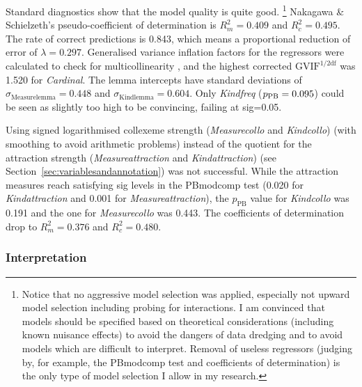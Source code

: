 Standard diagnostics show that the model quality is quite good.%
\footnote{Notice that no aggressive model selection was applied, especially not upward model selection including probing for interactions.
I am convinced that models should be specified based on theoretical considerations (including known nuisance effects) to avoid the dangers of data dredging and to avoid models which are difficult to interpret.
Removal of useless regressors (judging by, for example, the PBmodcomp test and coefficients of determination) is the only type of model selection I allow in my research.}
Nakagawa \& Schielzeth's pseudo-coefficient of determination is $R_m^2=0.409$ and $R^2_c=0.495$.
The rate of correct predictions is 0.843, which means a proportional reduction of error of $\lambda=0.297$.
Generalised variance inflation factors for the regressors were calculated to check for multicollinearity \citep{FoxMonette1992,ZuurEa2010}, and the highest corrected $\text{GVIF}^{1/2\text{df}}$ was 1.520 for \textit{Cardinal}.
The lemma intercepts have standard deviations of $\sigma_{\text{Measurelemma}}=0.448$ and $\sigma_{\text{Kindlemma}}=0.604$.
Only \textit{Kindfreq} ($p_{\text{PB}}=0.095$) could be seen as slightly too high to be convincing, failing at sig=0.05.

Using signed logarithmised collexeme strength (\textit{Measurecollo} and \textit{Kindcollo}) (with smoothing to avoid arithmetic problems) instead of the quotient for the attraction strength (\textit{Measureattraction} and \textit{Kindattraction}) (see Section~\ref{sec:variablesandannotation}) was not successful.
While the attraction measures reach satisfying sig levels in the PBmodcomp test (0.020 for \textit{Kindattraction} and 0.001 for \textit{Measureattraction}), the $p_{\text{PB}}$ value for \textit{Kindcollo} was 0.191 and the one for \textit{Measurecollo} was 0.443.
The coefficients of determination drop to $R_m^2=0.376$ and $R^2_c=0.480$.

\subsubsection{Interpretation}
\label{sec:mainstudyinterpretation}

